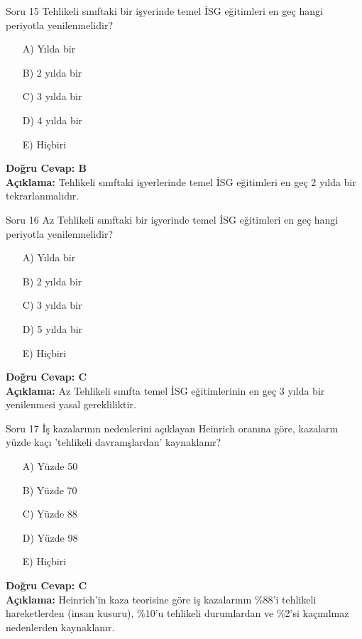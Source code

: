 \documentclass[12pt,a4paper]{article}
\begin{document}
\begin{testcard}{Soru 15}
    Tehlikeli sınıftaki bir işyerinde temel İSG eğitimleri en geç hangi periyotla yenilenmelidir?
    \begin{itemize}
        \item[A)] Yılda bir
        \item[B)] 2 yılda bir
        \item[C)] 3 yılda bir
        \item[D)] 4 yılda bir
        \item[E)] Hiçbiri
    \end{itemize}
    \tcblower
    \textbf{Doğru Cevap: B} \\
    \textbf{Açıklama:} Tehlikeli sınıftaki işyerlerinde temel İSG eğitimleri en geç 2 yılda bir tekrarlanmalıdır.
\end{testcard}

\begin{testcard}{Soru 16}
    Az Tehlikeli sınıftaki bir işyerinde temel İSG eğitimleri en geç hangi periyotla yenilenmelidir?
    \begin{itemize}
        \item[A)] Yılda bir
        \item[B)] 2 yılda bir
        \item[C)] 3 yılda bir
        \item[D)] 5 yılda bir
        \item[E)] Hiçbiri
    \end{itemize}
    \tcblower
    \textbf{Doğru Cevap: C} \\
    \textbf{Açıklama:} Az Tehlikeli sınıfta temel İSG eğitimlerinin en geç 3 yılda bir yenilenmesi yasal gerekliliktir.
\end{testcard}

\begin{testcard}{Soru 17}
    İş kazalarının nedenlerini açıklayan Heinrich oranına göre, kazaların yüzde kaçı 'tehlikeli davranışlardan' kaynaklanır?
    \begin{itemize}
        \item[A)] Yüzde 50
        \item[B)] Yüzde 70
        \item[C)] Yüzde 88
        \item[D)] Yüzde 98
        \item[E)] Hiçbiri
    \end{itemize}
    \tcblower
    \textbf{Doğru Cevap: C} \\
    \textbf{Açıklama:} Heinrich'in kaza teorisine göre iş kazalarının \%88'i tehlikeli hareketlerden (insan kusuru), \%10'u tehlikeli durumlardan ve \%2'si kaçınılmaz nedenlerden kaynaklanır.
\end{testcard}
\end{document}
